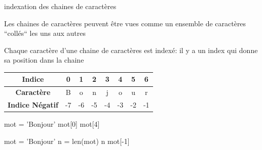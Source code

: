 \begin{easybox}{indexation des chaines de caractères}{}
    
    \begin{minipage}{0.5\linewidth}
 Les chaines de caractères peuvent être vues comme un ensemble de caractères ``collés`` les uns aux autres

    Chaque caractère d'une chaine de caractères est indexé: 
    il y a un index qui donne sa position dans la chaine       
    \end{minipage}\hfill{}
    \begin{minipage}{0.5\linewidth}
 \begin{center}
        \begin{tabular}{|c|c|c|c|c|c|c|c|}
        \hline
        \textbf{Indice} & 0 & 1 & 2 & 3 & 4 & 5 & 6 \\
        \hline
        \textbf{Caractère} & B & o & n & j & o & u & r \\
        \hline
        \textbf{Indice Négatif} & -7 & -6 & -5 & -4 & -3 & -2 & -1 \\
        \hline
        \end{tabular}
    \end{center}       
    \end{minipage}
    
   
    

    \begin{minipage}[t]{0.48\linewidth}
        \begin{ConsolePythontex}[ Label=false]{}
            mot = 'Bonjour'
            mot[0]
            mot[4]
        \end{ConsolePythontex}
    \end{minipage}\hfill
    \begin{minipage}[t]{0.48\linewidth}
        \begin{ConsolePythontex}[ Label=false]{}
mot = 'Bonjour'
n = len(mot)
n
mot[-1]
		\end{ConsolePythontex}
    \end{minipage}
   
\end{easybox}


